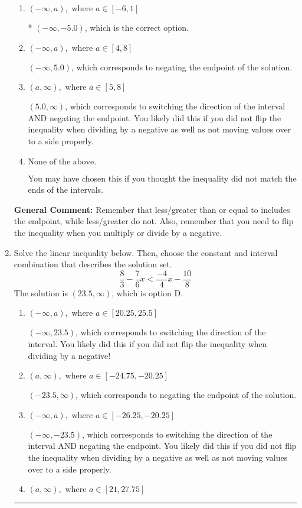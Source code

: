 \documentclass{extbook}[14pt]
\newcommand{\litem}[1]{\item #1

\rule{\textwidth}{0.4pt}}
\begin{document}
\begin{enumerate}
{\begin{enumerate}[label=\Alph*.]
 $(-5.0, \infty)$, which corresponds to switching the direction of the interval. You likely did this if you did not flip the inequality when dividing by a negative!
\item \( (-\infty, a), \text{ where } a \in [-6, 1] \)

* $(-\infty, -5.0)$, which is the correct option.
\item \( (-\infty, a), \text{ where } a \in [4, 8] \)

 $(-\infty, 5.0)$, which corresponds to negating the endpoint of the solution.
\item \( (a, \infty), \text{ where } a \in [5, 8] \)

 $(5.0, \infty)$, which corresponds to switching the direction of the interval AND negating the endpoint. You likely did this if you did not flip the inequality when dividing by a negative as well as not moving values over to a side properly.
\item \( \text{None of the above}. \)

You may have chosen this if you thought the inequality did not match the ends of the intervals.
\end{enumerate}

\textbf{General Comment:} Remember that less/greater than or equal to includes the endpoint, while less/greater do not. Also, remember that you need to flip the inequality when you multiply or divide by a negative.
}
\litem{
Solve the linear inequality below. Then, choose the constant and interval combination that describes the solution set.
\[ \frac{8}{3} - \frac{7}{6} x < \frac{-4}{4} x - \frac{10}{8} \]The solution is \( (23.5, \infty) \), which is option D.\begin{enumerate}[label=\Alph*.]
\item \( (-\infty, a), \text{ where } a \in [20.25, 25.5] \)

 $(-\infty, 23.5)$, which corresponds to switching the direction of the interval. You likely did this if you did not flip the inequality when dividing by a negative!
\item \( (a, \infty), \text{ where } a \in [-24.75, -20.25] \)

 $(-23.5, \infty)$, which corresponds to negating the endpoint of the solution.
\item \( (-\infty, a), \text{ where } a \in [-26.25, -20.25] \)

 $(-\infty, -23.5)$, which corresponds to switching the direction of the interval AND negating the endpoint. You likely did this if you did not flip the inequality when dividing by a negative as well as not moving values over to a side properly.
\item \( (a, \infty), \text{ where } a \in [21, 27.75] \)


\end{enumerate}}
\end{enumerate}
\end{document}
